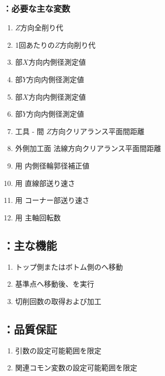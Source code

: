 \subsubsection{\KEndFaceRight：必要な主な変数}
\begin{enumerate}[label*=\sarrow]
\item \EndFacecutMilling$Z$方向全削り代
\item \EndFacecutMilling1回あたりの$Z$方向削り代
\item \TopEndFace 部$X$方向内側径測定値
\item \TopEndFace 部$Y$方向内側径測定値
\item \BottomEndFace 部$X$方向内側径測定値
\item \BottomEndFace 部$Y$方向内側径測定値
\item 工具 - \EndFace 間 $Z$方向クリアランス平面間距離
\item 外側加工面 法線方向クリアランス平面間距離
\item \EndFacecutMilling 用 内側径輪郭径補正値
\item \EndFacecutMilling 用 直線部送り速さ
\item \EndFacecutMilling 用 コーナー部送り速さ
\item \EndFacecutMilling 用 主軸回転数
\end{enumerate}


\subsection{\KEndFaceRight：主な機能}
\begin{enumerate}[label*=\sarrow]
\item トップ側またはボトム側の\EndFacecutMillingReferencePoint へ移動
\item 基準点へ移動後、\KOLeftFS を実行
\item 切削回数の取得および加工
\end{enumerate}


\subsection{\KEndFaceRight：品質保証}
\begin{enumerate}[label*=\sarrow]
\item {}引数の設定可能範囲を限定
\item 関連コモン変数の設定可能範囲を限定
\end{enumerate}



